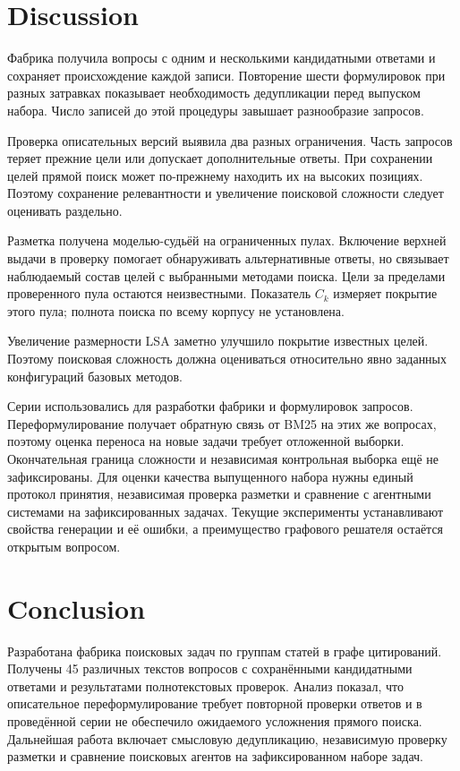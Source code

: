 \section{Discussion}\label{sec:disc}

Фабрика получила вопросы с одним и несколькими кандидатными ответами и сохраняет происхождение каждой записи. Повторение шести формулировок при разных затравках показывает необходимость дедупликации перед выпуском набора. Число записей до этой процедуры завышает разнообразие запросов.

Проверка описательных версий выявила два разных ограничения. Часть запросов теряет прежние цели или допускает дополнительные ответы. При сохранении целей прямой поиск может по-прежнему находить их на высоких позициях. Поэтому сохранение релевантности и увеличение поисковой сложности следует оценивать раздельно.

Разметка получена моделью-судьёй на ограниченных пулах. Включение верхней выдачи в проверку помогает обнаруживать альтернативные ответы, но связывает наблюдаемый состав целей с выбранными методами поиска. Цели за пределами проверенного пула остаются неизвестными. Показатель $C_k$ измеряет покрытие этого пула; полнота поиска по всему корпусу не установлена.

Увеличение размерности LSA заметно улучшило покрытие известных целей. Поэтому поисковая сложность должна оцениваться относительно явно заданных конфигураций базовых методов.

Серии использовались для разработки фабрики и формулировок запросов. Переформулирование получает обратную связь от BM25 на этих же вопросах, поэтому оценка переноса на новые задачи требует отложенной выборки. Окончательная граница сложности и независимая контрольная выборка ещё не зафиксированы. Для оценки качества выпущенного набора нужны единый протокол принятия, независимая проверка разметки и сравнение с агентными системами на зафиксированных задачах. Текущие эксперименты устанавливают свойства генерации и её ошибки, а преимущество графового решателя остаётся открытым вопросом.

\section{Conclusion}\label{sec:concl}

Разработана фабрика поисковых задач по группам статей в графе цитирований. Получены 45 различных текстов вопросов с сохранёнными кандидатными ответами и результатами полнотекстовых проверок. Анализ показал, что описательное переформулирование требует повторной проверки ответов и в проведённой серии не обеспечило ожидаемого усложнения прямого поиска. Дальнейшая работа включает смысловую дедупликацию, независимую проверку разметки и сравнение поисковых агентов на зафиксированном наборе задач.







